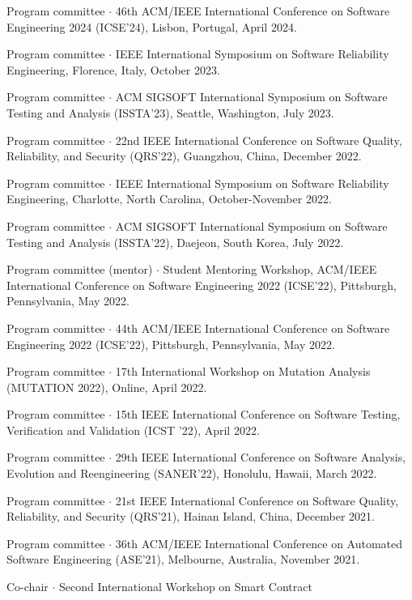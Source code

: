 \documentclass[ComputerScience]{vita}
\begin{document}
\begin{vita}
\begin{Panel and Committee Service}
  \item Program committee $\cdot$ 46th ACM/IEEE International Conference on 
    Software Engineering 2024 (ICSE'24), Lisbon, Portugal, April 2024.
\item Program committee $\cdot$ IEEE International Symposium on Software Reliability Engineering, Florence, Italy, October 2023.    
\item Program committee $\cdot$ ACM SIGSOFT International Symposium on Software Testing and Analysis (ISSTA'23), Seattle, Washington, July 2023.    
    \item Program committee $\cdot$ 22nd IEEE International Conference 
    on Software Quality, Reliability, and Security (QRS'22), Guangzhou, China, December 2022.     
\item Program committee $\cdot$ IEEE International Symposium on Software Reliability Engineering, Charlotte, North Carolina, October-November 2022.
\item Program committee $\cdot$ ACM SIGSOFT International Symposium on Software Testing and Analysis (ISSTA'22), Daejeon, South Korea, July 2022.
  \item Program committee (mentor) $\cdot$ Student Mentoring Workshop, ACM/IEEE International Conference on 
  Software Engineering 2022 (ICSE'22), Pittsburgh, Pennsylvania, 
  May 2022.
  \item Program committee $\cdot$ 44th ACM/IEEE International Conference on 
  Software Engineering 2022 (ICSE'22), Pittsburgh, Pennsylvania, 
  May 2022.
  \item Program committee $\cdot$ 17th International Workshop on
    Mutation Analysis (MUTATION 2022), Online,
  April 2022.  
  \item Program committee $\cdot$ 15th  IEEE International Conference on Software Testing, Verification and Validation (ICST '22), April 2022.
\item Program committee $\cdot$ 29th IEEE International Conference on Software Analysis, Evolution and Reengineering (SANER'22), Honolulu, Hawaii, March 2022.
    \item Program committee $\cdot$ 21st IEEE International Conference 
    on Software Quality, Reliability, and Security (QRS'21), Hainan 
    Island, China, December 2021.   
\item Program committee $\cdot$ 36th ACM/IEEE International Conference 
  on Automated Software Engineering (ASE'21), Melbourne, Australia, 
  November 2021.
\item Co-chair $\cdot$ Second International Workshop on Smart Contract 

\end{Panel and Committee Service}
\end{vita}
\end{document}
